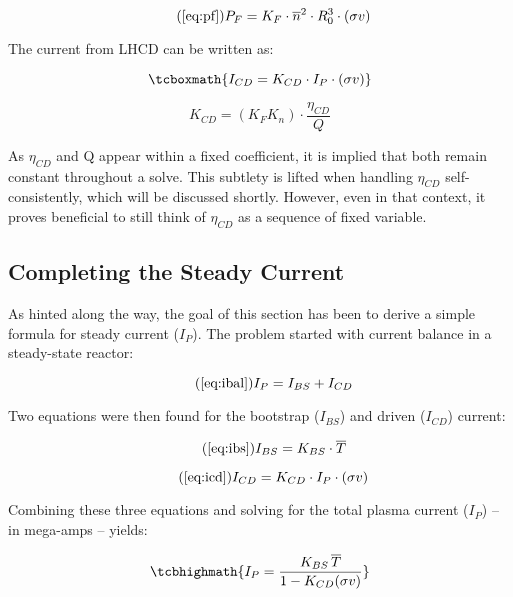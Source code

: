  \begin{equation}
	\tag{\ref{eq:pf}}
	P_F = K_F \cdot \overline{n}^2 \cdot R_0^3  \cdot (\sigma v)
\end{equation}

The current from LHCD can be written as:

\begin{equation}
	\label{eq:icd}
	\tcboxmath{
	I_{CD} = K_{CD} \cdot I_P \cdot ( \sigma v )
	}
\end{equation}

\begin{equation}
	K_{CD} = \left( K_F K_n \right) \cdot \frac{\eta_{CD}}{Q}
\end{equation}

As $\eta_{CD}$ and Q appear within a fixed coefficient, it is implied that both remain constant throughout a solve. This subtlety is lifted when handling $\eta_{CD}$ self-consistently, which will be discussed shortly. However, even in that context, it proves beneficial to still think of $\eta_{CD}$ as a sequence of fixed variable.

\subsection{Completing the Steady Current}

As hinted along the way, the goal of this section has been to derive a simple formula for steady current ($I_P$). The problem started with current balance in a steady-state reactor:

\begin{equation}
	\tag{\ref{eq:ibal}}
	I_P = I_{BS} + I_{CD}
\end{equation}

Two equations were then found for the bootstrap ($I_{BS}$) and driven ($I_{CD}$) current:

\begin{equation}
	\tag{\ref{eq:ibs}}
	I_{BS} = K_{BS} \cdot \overline T
\end{equation}

\begin{equation}
	\tag{\ref{eq:icd}}
	I_{CD} = K_{CD} \cdot I_P \cdot ( \sigma v )
\end{equation}

Combining these three equations and solving for the total plasma current ($I_P$) -- in mega-amps -- yields:

\begin{equation}
	\label{eq:steady}
	\tcbhighmath{
	I_P = \frac{ K_{BS} \, \overline T }{ 1 - K_{CD} ( \sigma v ) }
	}
\end{equation}

